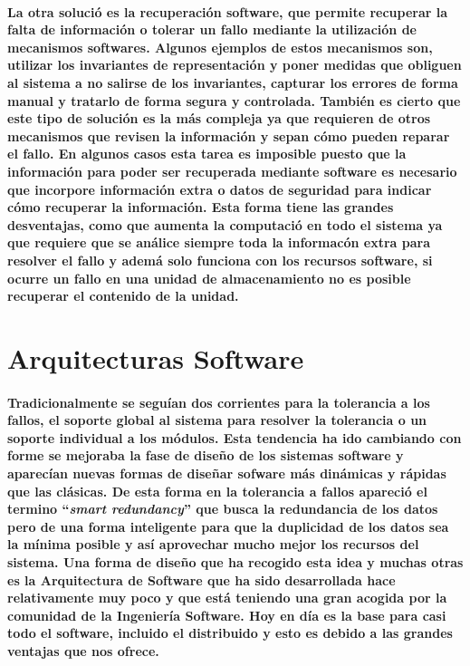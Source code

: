 \documentclass{./llncs2e/llncs}
\begin{document}
\paragraph{
La otra soluci\'{o} es la recuperaci\'{o}n software, que permite recuperar la falta de informaci\'{o}n o tolerar un fallo mediante la utilizaci\'{o}n de mecanismos softwares.
Algunos ejemplos de estos mecanismos son, utilizar los invariantes de representaci\'{o}n y poner medidas que obliguen al sistema a no salirse de los invariantes, capturar los errores de forma manual y tratarlo de forma segura y controlada.
Tambi\'{e}n es cierto que este tipo de soluci\'{o}n es la m\'{a}s compleja ya que requieren de otros mecanismos que revisen la informaci\'{o}n y sepan c\'{o}mo pueden reparar el fallo. En algunos casos esta tarea es imposible puesto que la información para poder ser recuperada mediante software es necesario que incorpore información extra o datos de seguridad para indicar c\'{o}mo recuperar la información. Esta forma tiene las grandes desventajas, como que aumenta la computaci\'{o} en todo el sistema ya que requiere que se an\'{a}lice siempre toda la informac\'{o}n extra para resolver el fallo y adem\'{a} solo funciona con los recursos software, si ocurre un fallo en una unidad de almacenamiento no es posible recuperar el contenido de la unidad. 
}

\section{Arquitecturas Software}
\paragraph{
Tradicionalmente se segu\'{i}an dos corrientes para la tolerancia a los fallos, el soporte global al sistema para resolver la tolerancia o un soporte individual a los m\'{o}dulos.
Esta tendencia ha ido cambiando con forme se mejoraba la fase de diseño de los sistemas software y aparec\'{i}an nuevas formas de diseñar sofware m\'{a}s din\'{a}micas y r\'{a}pidas que las cl\'{a}sicas. De esta forma en la tolerancia a fallos apareci\'{o} el termino ``\textit{smart redundancy}'' que busca la redundancia de los datos pero de una forma inteligente para que la duplicidad de los datos sea la m\'{i}nima posible y as\'{i} aprovechar mucho mejor los recursos del sistema. Una forma de diseño que ha recogido esta
idea y muchas otras es la Arquitectura de Software que ha sido desarrollada hace relativamente muy poco y que est\'{a} teniendo una gran acogida por la comunidad de la Ingenier\'{i}a Software. Hoy en d\'{i}a es la base para casi todo el software, incluido el distribuido y esto es debido a las grandes ventajas que nos ofrece.
}
\end{document}
